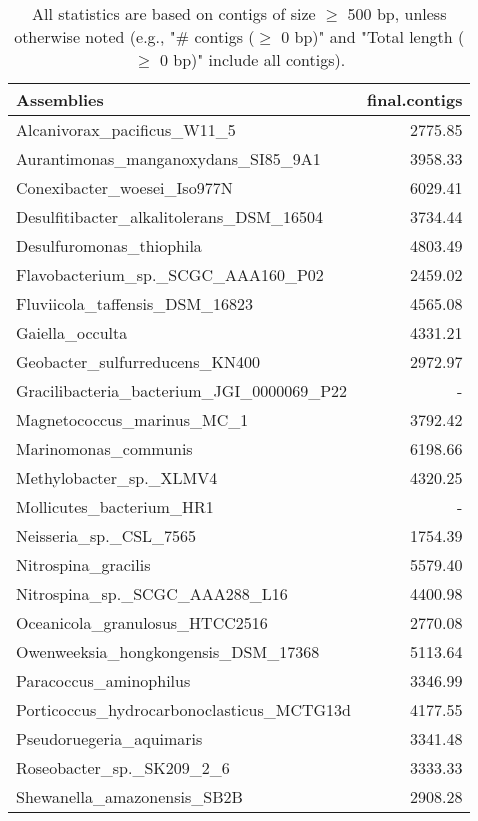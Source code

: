 \documentclass[12pt,a4paper]{article}
\begin{document}
\begin{table}[ht]
\begin{center}
\caption{All statistics are based on contigs of size $\geq$ 500 bp, unless otherwise noted (e.g., "\# contigs ($\geq$ 0 bp)" and "Total length ($\geq$ 0 bp)" include all contigs).}
\begin{tabular}{|l*{1}{|r}|}
\hline
Assemblies & final.contigs \\ \hline
Alcanivorax\_pacificus\_W11\_5 & 2775.85 \\ \hline
Aurantimonas\_manganoxydans\_SI85\_9A1 & 3958.33 \\ \hline
Conexibacter\_woesei\_Iso977N & 6029.41 \\ \hline
Desulfitibacter\_alkalitolerans\_DSM\_16504 & 3734.44 \\ \hline
Desulfuromonas\_thiophila & 4803.49 \\ \hline
Flavobacterium\_sp.\_SCGC\_AAA160\_P02 & 2459.02 \\ \hline
Fluviicola\_taffensis\_DSM\_16823 & 4565.08 \\ \hline
Gaiella\_occulta & 4331.21 \\ \hline
Geobacter\_sulfurreducens\_KN400 & 2972.97 \\ \hline
Gracilibacteria\_bacterium\_JGI\_0000069\_P22 & - \\ \hline
Magnetococcus\_marinus\_MC\_1 & 3792.42 \\ \hline
Marinomonas\_communis & 6198.66 \\ \hline
Methylobacter\_sp.\_XLMV4 & 4320.25 \\ \hline
Mollicutes\_bacterium\_HR1 & - \\ \hline
Neisseria\_sp.\_CSL\_7565 & 1754.39 \\ \hline
Nitrospina\_gracilis & 5579.40 \\ \hline
Nitrospina\_sp.\_SCGC\_AAA288\_L16 & 4400.98 \\ \hline
Oceanicola\_granulosus\_HTCC2516 & 2770.08 \\ \hline
Owenweeksia\_hongkongensis\_DSM\_17368 & 5113.64 \\ \hline
Paracoccus\_aminophilus & 3346.99 \\ \hline
Porticoccus\_hydrocarbonoclasticus\_MCTG13d & 4177.55 \\ \hline
Pseudoruegeria\_aquimaris & 3341.48 \\ \hline
Roseobacter\_sp.\_SK209\_2\_6 & 3333.33 \\ \hline
Shewanella\_amazonensis\_SB2B & 2908.28 \\ \hline

\end{tabular}
\end{center}
\end{table}
\end{document}
